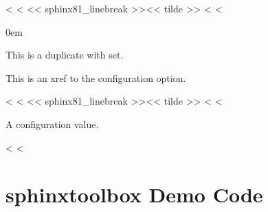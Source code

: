 \documentclass[letterpaper,10pt,english]{sphinxmanual}
\begin{document}
\begin{fulllineitems}
<%
\pysigstartsignatures
<%
\pysigline<< sphinx81_linebreak >>{}<< tilde >>
<%
<%
\vspace{-30px}

\begin{DUlineblock}{0em}
\item[]  
\end{DUlineblock}

\vspace{-25px}

This is a duplicate with  set.

\end{fulllineitems}


This is an xref to the {\hyperref[\detokenize{confval:confval-github_repository}]{}} configuration option.

\begin{fulllineitems}
\label{\detokenize{confval:confval-something}}
<%
\pysigstartsignatures
<%
\pysigline<< sphinx81_linebreak >>{}<< tilde >>
<%
<%
\vspace{-25px}

A configuration value.

\end{fulllineitems}

<%
\sphinxstepscope
<%

\chapter{sphinx\sphinxhyphen{}toolbox Demo \sphinxhyphen{} Code}
\label{\detokenize{code-block:sphinx-toolbox-demo-code}}\label{\detokenize{code-block::doc}}
\begin{sphinxVerbatim}[commandchars=\\\{\}]
 
\end{sphinxVerbatim}
\end{document}
